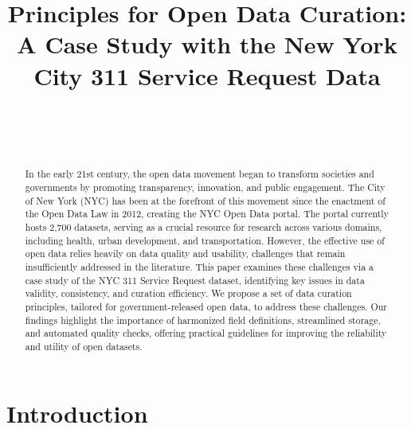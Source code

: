 \documentclass[linenumber]{jdsart}
\begin{document}



\begin{frontmatter}
  
\title{Principles for Open Data Curation: A Case Study with the New
York City 311 Service Request Data}

\author[1]{~}
\author[2]{~}
\address[1]{, }
\address[2]{Department of Statistics,
  , }



\begin{abstract}
In the early 21st century, the open data movement began to transform 
societies and governments by promoting transparency,
innovation, and public engagement. The City of New York (NYC) has been at
the forefront of this movement since the enactment of the Open 
Data Law in 2012, creating the NYC Open Data
portal. The portal currently hosts 2,700 datasets,
serving as a crucial resource for research across various domains, 
including health, urban development, and transportation. However, the
effective use of open data relies heavily on data quality and
usability, challenges that remain insufficiently addressed in the
literature. This paper examines these challenges via a
case study of the NYC 311 Service Request dataset,  identifying key
issues in data validity, consistency, and curation efficiency. We
propose a set of data curation principles, tailored for
government-released open data, to address these challenges.
Our findings highlight the importance of harmonized field definitions,
streamlined storage, and automated quality checks, offering practical
guidelines for improving the reliability and utility of open datasets.
\end{abstract}

\begin{keywords} %
\end{keywords}

\end{frontmatter}

\section{Introduction} 
\label{sec:intro}
\end{document}
